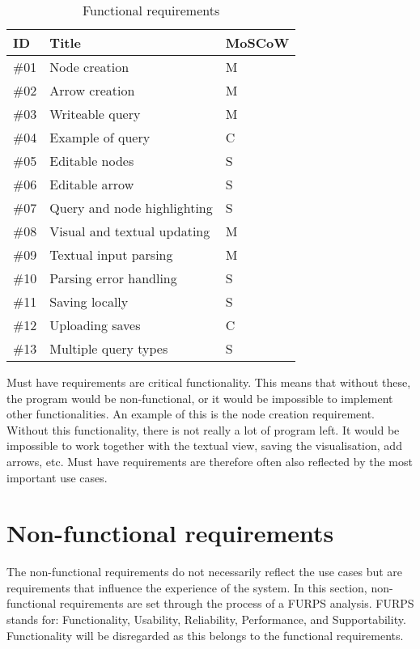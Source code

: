 \begin{table}[h]
\centering
\begin{tabular}{|l|l|l|}
\hline
\rowcolor[HTML]{9B9B9B}
ID  & Title                       & MoSCoW \\ \hline
\#01 & Node creation               & M      \\ \hline
\#02 & Arrow creation              & M      \\ \hline
\#03 & Writeable query             & M      \\ \hline
\#04 & Example of query            & C      \\ \hline
\#05 & Editable nodes              & S      \\ \hline
\#06 & Editable arrow              & S      \\ \hline
\#07 & Query and node highlighting & S      \\ \hline
\#08 & Visual and textual updating & M      \\ \hline
\#09 & Textual input parsing       & M      \\ \hline
\#10 & Parsing error handling      & S      \\ \hline
\#11 & Saving locally              & S      \\ \hline
\#12 & Uploading saves             & C      \\ \hline
\#13 & Multiple query types        & S      \\ \hline
\end{tabular}
\label{tab:funcrequirements}
\caption{Functional requirements}
\end{table}

Must have requirements are critical functionality. This means that without these, the program would be non-functional, or it would be impossible to implement other functionalities. An example of this is the node creation requirement. Without this functionality, there is not really a lot of program left. It would be impossible to work together with the textual view, saving the visualisation, add arrows, etc. Must have requirements are therefore often also reflected by the most important use cases.

\section{Non-functional requirements}
The non-functional requirements do not necessarily reflect the use cases but are requirements that influence the experience of the system. In this section, non-functional requirements are set through the process of a FURPS analysis. FURPS stands for: Functionality, Usability, Reliability, Performance, and Supportability. Functionality will be disregarded as this belongs to the functional requirements.


